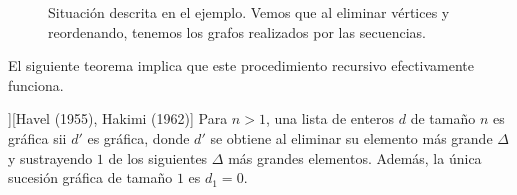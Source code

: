 \begin{ejem}
\begin{figure}
        \caption[]{Situación descrita en el ejemplo. Vemos que al eliminar vértices y reordenando, tenemos los grafos realizados por las secuencias.}
        \label{fig:sec3}
    \end{figure}
\end{ejem}

El siguiente teorema implica que este procedimiento recursivo efectivamente funciona.

\begin{teo}][Havel (1955), Hakimi (1962)]
    Para $n > 1$, una lista de enteros $d$ de tamaño $n$ es gráfica sii $d'$ es gráfica, donde $d'$ se obtiene al eliminar su elemento más grande $\Delta$ y sustrayendo $1$ de los siguientes $\Delta$ más grandes elementos. Además, la única sucesión gráfica de tamaño $1$ es $d_1 = 0$.
\end{teo}

